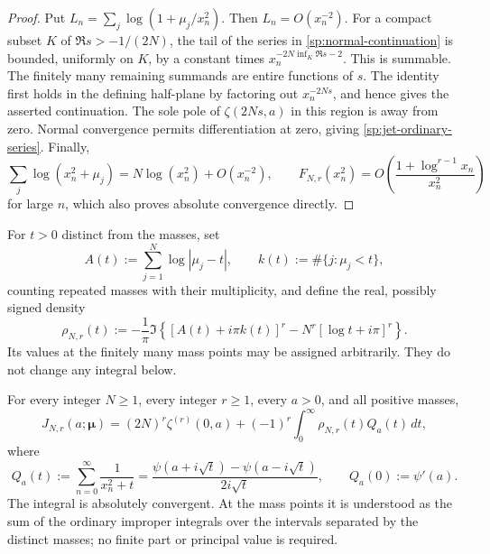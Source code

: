 \begin{proof}
Put $L_n=\sum_j\log(1+\mu_j/x_n^2)$.  Then $L_n=O(x_n^{-2})$.
For a compact subset $K$ of $\Re s>-1/(2N)$, the tail of the
series in \eqref{sp:normal-continuation} is bounded, uniformly on $K$,
by a constant times $x_n^{-2N\inf_K\Re s-2}$.  This is summable.
The finitely many remaining summands are entire functions of $s$.
The identity first holds in the defining half-plane by factoring
out $x_n^{-2Ns}$, and hence gives the asserted continuation.
The sole pole of $\zeta(2Ns,a)$ in this region is away from zero.
Normal convergence permits differentiation at zero, giving
\eqref{sp:jet-ordinary-series}.  Finally,
\[
 \sum_j\log(x_n^2+\mu_j)=N\log(x_n^2)+O(x_n^{-2}),
 \qquad
 F_{N,r}(x_n^2)=O\left(\frac{1+\log^{r-1}x_n}{x_n^2}\right)
\]
for large $n$, which also proves absolute convergence directly.
\end{proof}

For $t>0$ distinct from the masses, set
\begin{equation}
 A(t):=\sum_{j=1}^{N}\log|\mu_j-t|,
 \qquad k(t):=\#\{j:\mu_j<t\},
 \label{sp:cut-data}
\end{equation}
counting repeated masses with their multiplicity, and define the
real, possibly signed density
\begin{equation}
 \rho_{N,r}(t):=-\frac{1}{\pi}\Im\left\{
        [A(t)+i\pi k(t)]^r
           -N^r[\log t+i\pi]^r\right\}.
 \label{sp:scalar-density}
\end{equation}
Its values at the finitely many mass points may be assigned
arbitrarily.  They do not change any integral below.

\begin{theorem}
\label{sp:master}
For every integer $N\geq1$, every integer $r\geq1$, every $a>0$,
and all positive masses,
\begin{equation}
 \boxed{\displaystyle
 J_{N,r}(a;\boldsymbol\mu)
 =(2N)^r\zeta^{(r)}(0,a)
       +(-1)^r\int_0^{\infty}\rho_{N,r}(t)Q_a(t)\,dt,}
 \label{sp:master-formula}
\end{equation}
where
\begin{equation}
 Q_a(t):=\sum_{n=0}^{\infty}\frac{1}{x_n^2+t}
 =\frac{\psi(a+i\sqrt t)-\psi(a-i\sqrt t)}{2i\sqrt t},
 \qquad Q_a(0):=\psi'(a).
 \label{sp:resolvent-kernel}
\end{equation}
The integral is absolutely convergent.  At the mass points it is
understood as the sum of the ordinary improper integrals over the
intervals separated by the distinct masses; no finite part or
principal value is required.
\end{theorem}

